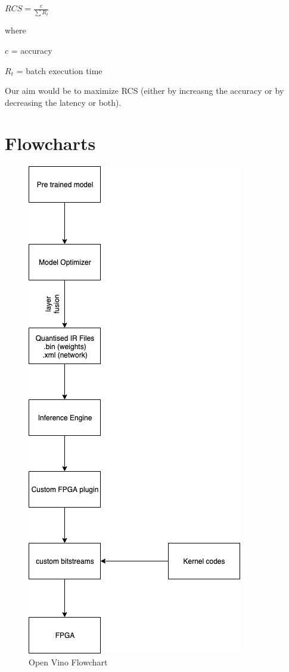 \documentclass[titlepage]{report}
\begin{document}
$RCS = \frac{c}{\sum R_t}$    

where   

$c$ = accuracy    

      $R_t$ = batch execution time  
      
Our aim would be to maximize RCS (either by increasng the accuracy or by decreasing the latency or both).


\chapter{Flowcharts}



\begin{figure}[h!]
    \centering
    \includegraphics[scale=0.65]{open_vino_flowchart.jpg}
    \caption{Open Vino Flowchart}
\end{figure}
\end{document}
